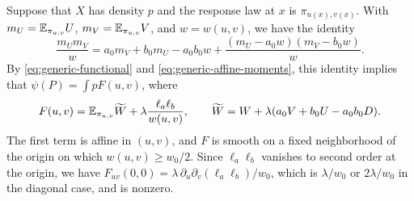 Suppose that $X$ has density $p$ and the response law at $x$ is
$\pi_{u(x),v(x)}$. With $m_U=\mathbb E_{\pi_{u,v}}U$, $m_V=\mathbb E_{\pi_{u,v}}V$,
and $w=w(u,v)$, we have the identity
\[
 \frac{m_Um_V}w=a_0m_V+b_0m_U-a_0b_0w
 +\frac{(m_U-a_0w)(m_V-b_0w)}w .
\]
By \eqref{eq:generic-functional} and
\eqref{eq:generic-affine-moments}, this identity implies that
$\psi(P)=\int pF(u,v)$,
where
\begin{equation}\label{eq:generic-lower-integrand}
 F(u,v)=\mathbb E_{\pi_{u,v}}\widetilde W+\lambda\frac{\ell_a\ell_b}{w(u,v)},
 \qquad \widetilde W=W+\lambda(a_0V+b_0U-a_0b_0D).
\end{equation}
The first term is affine in $(u,v)$, and $F$ is smooth on a fixed
neighborhood of the origin on which $w(u,v)\ge w_0/2$. Since
$\ell_a\ell_b$ vanishes to second order at the origin, we have
$F_{uv}(0,0)=\lambda\,\partial_u\partial_v(\ell_a\ell_b)/w_0$, which is
$\lambda/w_0$ or $2\lambda/w_0$ in the diagonal case, and is nonzero.

